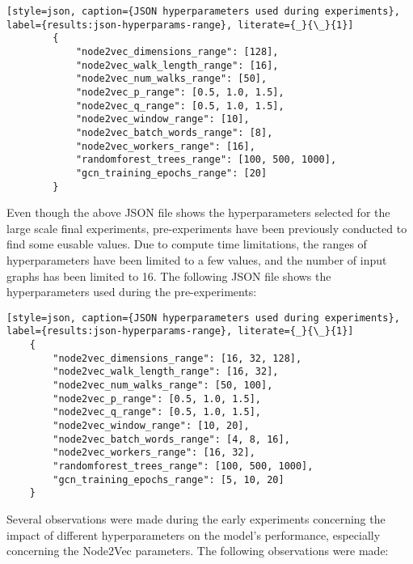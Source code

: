 \begin{lstlisting}[style=json, caption={JSON hyperparameters used during experiments}, label={results:json-hyperparams-range}, literate={_}{\_}{1}]
        {
            "node2vec_dimensions_range": [128],
            "node2vec_walk_length_range": [16],
            "node2vec_num_walks_range": [50],
            "node2vec_p_range": [0.5, 1.0, 1.5],
            "node2vec_q_range": [0.5, 1.0, 1.5],
            "node2vec_window_range": [10],
            "node2vec_batch_words_range": [8],
            "node2vec_workers_range": [16],
            "randomforest_trees_range": [100, 500, 1000],
            "gcn_training_epochs_range": [20]
        }
\end{lstlisting}

Even though the above JSON file shows the hyperparameters selected for the large scale final experiments, pre-experiments have been previously conducted to find some eusable values. Due to compute time limitations, the ranges of hyperparameters have been limited to a few values, and the number of input graphs has been limited to 16. The following JSON file shows the hyperparameters used during the pre-experiments:

\begin{lstlisting}[style=json, caption={JSON hyperparameters used during experiments}, label={results:json-hyperparams-range}, literate={_}{\_}{1}]
    {
        "node2vec_dimensions_range": [16, 32, 128],
        "node2vec_walk_length_range": [16, 32],
        "node2vec_num_walks_range": [50, 100],
        "node2vec_p_range": [0.5, 1.0, 1.5],
        "node2vec_q_range": [0.5, 1.0, 1.5],
        "node2vec_window_range": [10, 20],
        "node2vec_batch_words_range": [4, 8, 16],
        "node2vec_workers_range": [16, 32],
        "randomforest_trees_range": [100, 500, 1000],
        "gcn_training_epochs_range": [5, 10, 20]
    }
\end{lstlisting}

Several observations were made during the early experiments concerning the impact of different hyperparameters on the model's performance, especially concerning the Node2Vec parameters. The following observations were made:

